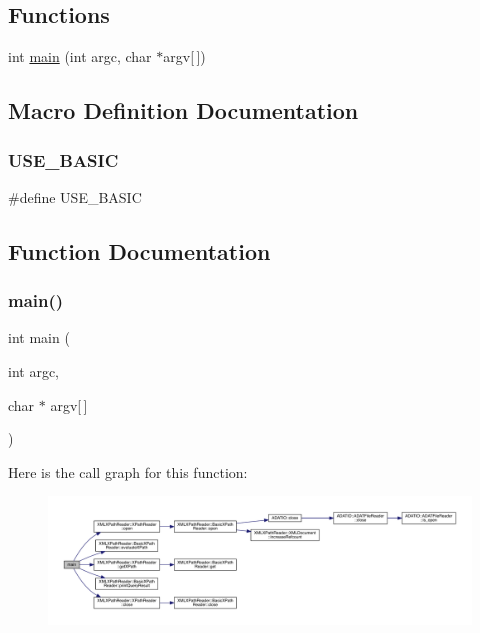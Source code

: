 \subsection*{Functions}
\begin{DoxyCompactItemize}
\item 
int \mbox{\hyperlink{adat-devel_2other__libs_2xpath__reader_2examples_2print__nodeset_8cc_a0ddf1224851353fc92bfbff6f499fa97}{main}} (int argc, char $\ast$argv\mbox{[}$\,$\mbox{]})
\end{DoxyCompactItemize}


\subsection{Macro Definition Documentation}
\mbox{\label{adat-devel_2other__libs_2xpath__reader_2examples_2print__nodeset_8cc_a5935552aa171b1701b8bae3b001fde72}} 
\subsubsection{\texorpdfstring{USE\_BASIC}{USE\_BASIC}}
{\footnotesize\ttfamily \#define U\+S\+E\+\_\+\+B\+A\+S\+IC}



\subsection{Function Documentation}
\mbox{\label{adat-devel_2other__libs_2xpath__reader_2examples_2print__nodeset_8cc_a0ddf1224851353fc92bfbff6f499fa97}} 
\subsubsection{\texorpdfstring{main()}{main()}}
{\footnotesize\ttfamily int main (\begin{DoxyParamCaption}\item[{int}]{argc,  }\item[{char $\ast$}]{argv\mbox{[}$\,$\mbox{]} }\end{DoxyParamCaption})}

Here is the call graph for this function\+:
\nopagebreak
\begin{figure}[H]
\begin{center}
\leavevmode
\includegraphics[width=350pt]{d7/d04/adat-devel_2other__libs_2xpath__reader_2examples_2print__nodeset_8cc_a0ddf1224851353fc92bfbff6f499fa97_cgraph}
\end{center}
\end{figure}
